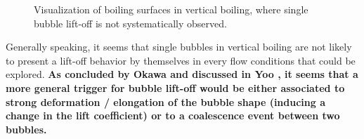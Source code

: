 \begin{figure}[h!]
\begin{center}
\hspace{5pt}
\end{center}
\caption{Visualization of boiling surfaces in vertical boiling, where single bubble lift-off is not systematically observed.} 
\label{fig:exp_nolift}
\end{figure}


\npar

Generally speaking, it seems that single bubbles in vertical boiling are not likely to present a lift-off behavior by themselves in every flow conditions that could be explored. \textbf{As concluded by Okawa \etal \cite{okawa_bubble_2005} and discussed in Yoo \etal \cite{yoo_experimental_2016-1}, it seems that a more general trigger for bubble lift-off would be either associated to strong deformation / elongation of the bubble shape (inducing a change in the lift coefficient) or to a coalescence event between two bubbles. }

